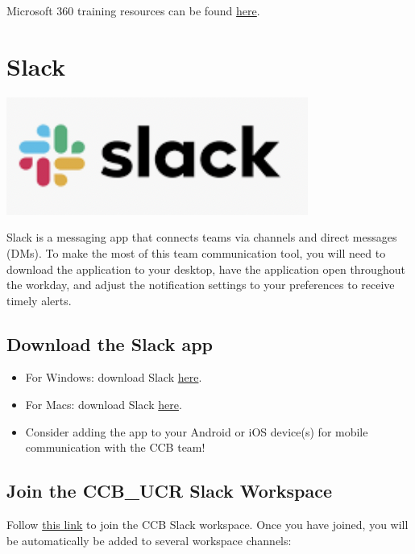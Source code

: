 \documentclass[
]{book}
\providecommand{\tightlist}{%
  \setlength{\itemsep}{0pt}\setlength{\parskip}{0pt}}
\begin{document}
Microsoft 360 training resources can be found \href{https://support.microsoft.com/en-us/training}{here}.

\hypertarget{slack}{%
\section{Slack}\label{slack}}

\begin{flushleft}\includegraphics{images/slack} \end{flushleft}

Slack is a messaging app that connects teams via channels and direct messages (DMs). To make the most of this team communication tool, you will need to download the application to your desktop, have the application open throughout the workday, and adjust the notification settings to your preferences to receive timely alerts.

\hypertarget{download-the-slack-app}{%
\subsection{Download the Slack app}\label{download-the-slack-app}}

\begin{itemize}
\tightlist
\item
  For Windows: download Slack \href{https://slack.com/downloads/windows}{here}.
\item
  For Macs: download Slack \href{https://slack.com/downloads/mac}{here}.
\item
  Consider adding the app to your Android or iOS device(s) for mobile communication with the CCB team!
\end{itemize}

\hypertarget{join-the-ccb_ucr-slack-workspace}{%
\subsection{Join the CCB\_UCR Slack Workspace}\label{join-the-ccb_ucr-slack-workspace}}

Follow \href{https://join.slack.com/t/ccbucr/shared_invite/zt-1dfpaguqs-F4CAPCI4ILMvT0JOcSpnag}{this link} to join the CCB Slack workspace. Once you have joined, you will be automatically be added to several workspace channels:
\end{document}
